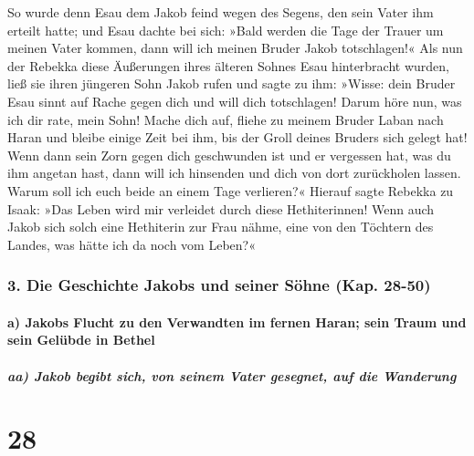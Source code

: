  So wurde denn Esau dem Jakob feind wegen des Segens, den
sein Vater ihm erteilt hatte; und Esau dachte bei sich: »Bald werden die
Tage der Trauer um meinen Vater kommen, dann will ich meinen Bruder
Jakob totschlagen!«  Als nun der Rebekka diese Äußerungen
ihres älteren Sohnes Esau hinterbracht wurden, ließ sie ihren jüngeren
Sohn Jakob rufen und sagte zu ihm: »Wisse: dein Bruder Esau sinnt auf
Rache gegen dich und will dich totschlagen!  Darum höre
nun, was ich dir rate, mein Sohn! Mache dich auf, fliehe zu meinem
Bruder Laban nach Haran  und bleibe einige Zeit bei ihm,
bis der Groll deines Bruders sich gelegt hat!  Wenn dann
sein Zorn gegen dich geschwunden ist und er vergessen hat, was du ihm
angetan hast, dann will ich hinsenden und dich von dort zurückholen
lassen. Warum soll ich euch beide an einem Tage verlieren?«
 Hierauf sagte Rebekka zu Isaak: »Das Leben wird mir
verleidet durch diese Hethiterinnen! Wenn auch Jakob sich solch eine
Hethiterin zur Frau nähme, eine von den Töchtern des Landes, was hätte
ich da noch vom Leben?«

\hypertarget{die-geschichte-jakobs-und-seiner-suxf6hne-kap.-28-50}{%
\subsubsection{3. Die Geschichte Jakobs und seiner Söhne (Kap.
28-50)}\label{die-geschichte-jakobs-und-seiner-suxf6hne-kap.-28-50}}

\hypertarget{a-jakobs-flucht-zu-den-verwandten-im-fernen-haran-sein-traum-und-sein-geluxfcbde-in-bethel}{%
\paragraph{a) Jakobs Flucht zu den Verwandten im fernen Haran; sein
Traum und sein Gelübde in
Bethel}\label{a-jakobs-flucht-zu-den-verwandten-im-fernen-haran-sein-traum-und-sein-geluxfcbde-in-bethel}}

\hypertarget{aa-jakob-begibt-sich-von-seinem-vater-gesegnet-auf-die-wanderung}{%
\subparagraph{aa) Jakob begibt sich, von seinem Vater gesegnet, auf die
Wanderung}\label{aa-jakob-begibt-sich-von-seinem-vater-gesegnet-auf-die-wanderung}}

\hypertarget{section-27}{%
\section{28}\label{section-27}}

